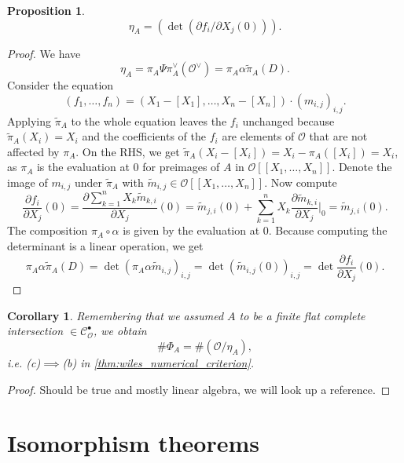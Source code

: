 \documentclass{article}
\theoremstyle{plain}%
\newtheorem{proposition}{Proposition}[section]
\newtheorem{corollary}{Corollary}[section]
\theoremstyle{definition}
\theoremstyle{remark}
\newcommand{\cob}{\mathcal{C}_\mathcal{O}^\bullet}
\begin{document}
\begin{proposition}\cite[proposition 5.19]{darmon1995fermat}
    \[
        \eta_A = (\det(\partial f_i/\partial X_j(0))).
    \]
\end{proposition}
\begin{proof}
    We have \[
        \eta_A = \pi_A \Psi \pi_A^\vee(\mathcal{O}^\vee) = \pi_A\alpha \tilde \pi_A(D).
    \]
    Consider the equation
    \[
        (f_1, \dots, f_n) = (X_1 - [X_1], \dots, X_n - [X_n]) \cdot (m_{i,j})_{i,j}.
    \]
    Applying \(\tilde \pi_A\) to the whole equation leaves the \(f_i\) unchanged because \(\tilde \pi_A(X_i) = X_i\)
    and the coefficients of the \(f_i\) are elements of \(\mathcal{O}\) that are not affected by \(\pi_A\).
    On the RHS, we get \(\tilde \pi_A(X_i - [X_i]) = X_i - \pi_A([X_i]) = X_i\), as \(\pi_A\) 
    is the evaluation at \(0\) for preimages of \(A\) in \(\mathcal{O}[[X_1, \dots, X_n]]\).
    Denote the image of \(m_{i,j}\) under \(\tilde \pi_A\) with \(\tilde m_{i,j} \in \mathcal{O}[[X_1, \dots, X_n]]\).
    Now compute
    \[
        \frac{\partial f_i}{\partial X_j}(0) = \frac{\partial \sum_{k=1}^n X_k\tilde m_{k,i}}{\partial X_j}(0) 
        = \tilde m_{j,i}(0) + \sum_{k=1}^n X_k \frac{\partial \tilde m_{k,i}}{\partial X_j}\bigg|_{0} 
        = \tilde m_{j,i}(0).
    \]
    The composition \(\pi_A \circ \alpha\) is given by the evaluation at \(0\).
    Because computing the determinant is a linear operation, we get
    \[
        \pi_A \alpha \tilde \pi_A(D) = \det(\pi_A\alpha \tilde m_{i,j})_{i,j} = \det(\tilde m_{i,j}(0))_{i,j}
        = \det \frac{\partial f_i}{\partial X_j}(0).
    \]
\end{proof}

\begin{corollary}\cite[corollary 5.20]{darmon1995fermat}\label{cor:cimpliesb}
    Remembering that we assumed \(A\) to be a finite flat complete intersection \(\in \cob\), we obtain
    \[
        \# \Phi_A = \# (\mathcal{O}/\eta_A),
    \]
    i.e. (c)\(\implies\)(b) in \cref{thm:wiles_numerical_criterion}.
\end{corollary}
\begin{proof}
    Should be true and mostly linear algebra, we will look up a reference.
\end{proof}

\section{Isomorphism theorems}
\end{document}
